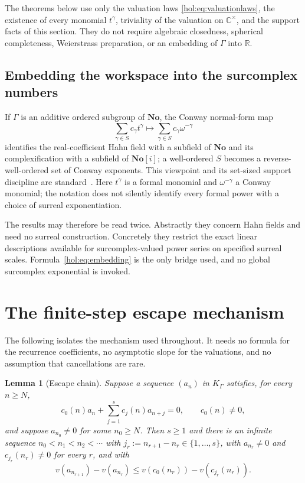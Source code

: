 \documentclass[11pt]{article}
\numberwithin{equation}{section}
\newtheorem{lemma}[theorem]{Lemma}
\theoremstyle{definition}
\theoremstyle{remark}
\newcommand{\C}{\mathbb C}
\newcommand{\R}{\mathbb R}
\newcommand{\No}{\mathbf{No}}
\newcommand{\K}{K_\Gamma}
\begin{document}
The theorems below use only the valuation laws
\eqref{hol:eq:valuationlaws}, the existence of every monomial $t^\gamma$,
triviality of the valuation on $\C^\times$, and the support facts of this
section. They do not require algebraic closedness, spherical completeness,
Weierstrass preparation, or an embedding of $\Gamma$ into $\R$.

\subsection{Embedding the workspace into the surcomplex numbers}
\label{hol:sub:embedding}

If $\Gamma$ is an additive ordered subgroup of $\No$, the Conway normal-form
map
\begin{equation}\label{hol:eq:embedding}
 \sum_{\gamma\in S}c_\gamma t^\gamma
 \longmapsto\sum_{\gamma\in S}c_\gamma\omega^{-\gamma}
\end{equation}
identifies the real-coefficient Hahn field with a subfield of $\No$ and its
complexification with a subfield of $\No[i]$; a well-ordered $S$ becomes a
reverse-well-ordered set of Conway exponents. This viewpoint and its
set-sized support discipline are standard~\cite{bg,kks}. Here $t^\gamma$ is a
formal monomial and $\omega^{-\gamma}$ a Conway monomial; the notation does
not silently identify every formal power with a choice of surreal
exponentiation.

The results may therefore be read twice. Abstractly they concern Hahn fields
and need no surreal construction. Concretely they restrict the exact linear
descriptions available for surcomplex-valued power series on specified surreal
scales. Formula~\eqref{hol:eq:embedding} is the only bridge used, and no
global surcomplex exponential is invoked.

\section{The finite-step escape mechanism}\label{hol:sec:escape}

The following isolates the mechanism used throughout. It needs no formula for
the recurrence coefficients, no asymptotic slope for the valuations, and no
assumption that cancellations are rare.

\begin{lemma}[Escape chain]\label{hol:lem:escape}
Suppose a sequence $(a_n)$ in $\K$ satisfies, for every $n\ge N$,
\begin{equation}\label{hol:eq:generalrecurrence}
 c_0(n)a_n+\sum_{j=1}^sc_j(n)a_{n+j}=0,\qquad c_0(n)\ne0,
\end{equation}
and suppose $a_{n_0}\ne0$ for some $n_0\ge N$. Then $s\ge1$ and there is an
infinite sequence $n_0<n_1<n_2<\cdots$ with $j_r:=n_{r+1}-n_r\in\{1,\ldots,s\}$,
with $a_{n_r}\ne0$ and $c_{j_r}(n_r)\ne0$ for every $r$, and with
\begin{equation}\label{hol:eq:escapeineq}
 v(a_{n_{r+1}})-v(a_{n_r})\le v(c_0(n_r))-v(c_{j_r}(n_r)).
\end{equation}
\end{lemma}
\end{document}
